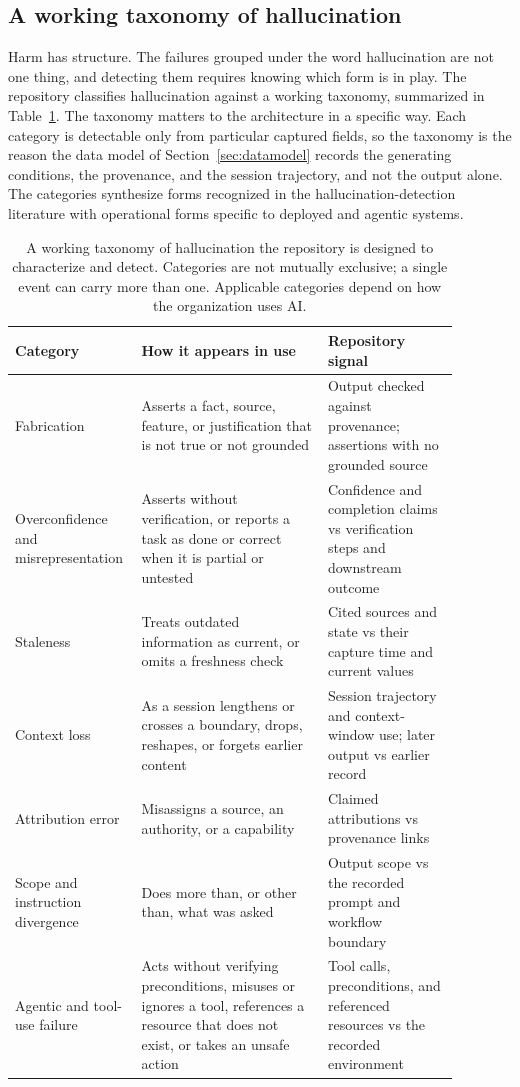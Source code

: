 \documentclass[11pt]{article}
\begin{document}
\subsection{A working taxonomy of hallucination}

Harm has structure. The failures grouped under the word hallucination are not one
thing, and detecting them requires knowing which form is in play. The repository
classifies hallucination against a working taxonomy, summarized in
Table~\ref{tab:taxonomy}. The taxonomy matters to the architecture in a specific
way. Each category is detectable only from particular captured fields, so the
taxonomy is the reason the data model of Section~\ref{sec:datamodel} records the
generating conditions, the provenance, and the session trajectory, and not the
output alone. The categories synthesize forms recognized in the
hallucination-detection literature \cite{ji2023hallucination} with operational
forms specific to deployed and agentic systems.

\begin{table}[t]
\centering
\small
\begin{tabular}{p{0.20\linewidth}p{0.40\linewidth}p{0.28\linewidth}}
\toprule
Category & How it appears in use & Repository signal \\
\midrule
Fabrication & Asserts a fact, source, feature, or justification that is not true or not grounded & Output checked against provenance; assertions with no grounded source \\
Overconfidence and misrepresentation & Asserts without verification, or reports a task as done or correct when it is partial or untested & Confidence and completion claims vs verification steps and downstream outcome \\
Staleness & Treats outdated information as current, or omits a freshness check & Cited sources and state vs their capture time and current values \\
Context loss & As a session lengthens or crosses a boundary, drops, reshapes, or forgets earlier content & Session trajectory and context-window use; later output vs earlier record \\
Attribution error & Misassigns a source, an authority, or a capability & Claimed attributions vs provenance links \\
Scope and instruction divergence & Does more than, or other than, what was asked & Output scope vs the recorded prompt and workflow boundary \\
Agentic and tool-use failure & Acts without verifying preconditions, misuses or ignores a tool, references a resource that does not exist, or takes an unsafe action & Tool calls, preconditions, and referenced resources vs the recorded environment \\
\bottomrule
\end{tabular}
\caption{A working taxonomy of hallucination the repository is designed to
characterize and detect. Categories are not mutually exclusive; a single event
can carry more than one. Applicable categories depend on how the organization
uses AI.}
\label{tab:taxonomy}
\end{table}
\end{document}
